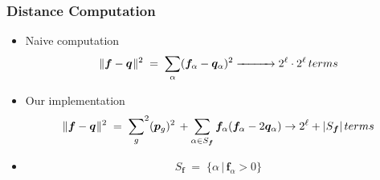 \documentclass[aspectratio=169]{beamer}
\begin{document}
  \begin{frame}
    \frametitle{Distance Computation}
    \begin{itemize}      
      \item{Naive computation 
      \[
	\|{\bm f} - {\bm q} \hspace{0.005in} \|^2 \; = \;
	  {\sum_{\alpha}} ({\bm f}_\alpha-{\bm q}_\alpha)^2 
	   \xrightarrow{\hspace*{1cm}} 2^\ell \cdot 2^\ell \, terms 
	\]}
      \item{Our implementation
	\begin{equation*}
	  \|{\bm f} - {\bm q} \hspace{0.005in} \|^2 \; = \; {\sum_{g}}^2 ({\bm p}_{g})^2 \, +
	  \sum_{\alpha \in {S_{\bm f}}} {\bm f}_\alpha ({\bm f}_\alpha- 2 {\bm q}_\alpha) \to 2^\ell + |S_{\bm f}| \, terms 
	\end{equation*}
      }
      \item{\[
	      S_{\bm f} \; = \; \{ \alpha \, | \, {\bm f}_\alpha > 0 \}
	      \]
      }
    \end{itemize}
  \end{frame}
  
\end{document}
